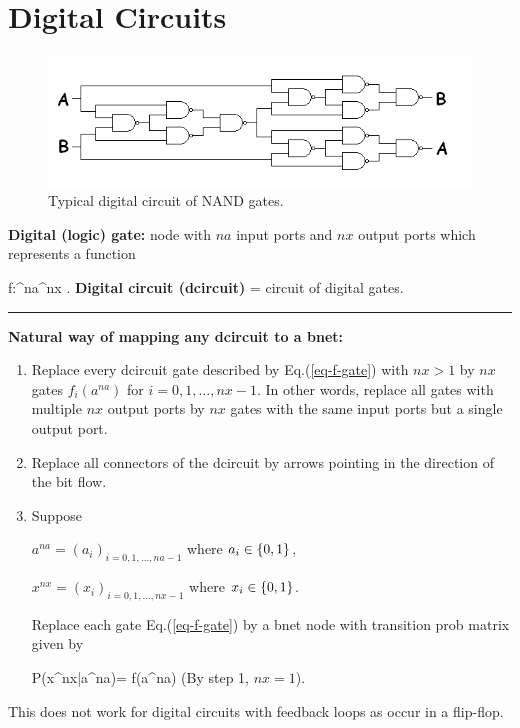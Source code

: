 \chapter{Digital Circuits}

\begin{figure}[h!]
\centering
\includegraphics[width=6in]{d-ckt/d-ckt.png}
\caption{Typical digital circuit
of NAND gates.}
\label{fig-d-ckt}
\end{figure}

{\bf Digital (logic) gate:} node with
$na$ input ports and $nx$ output ports
which represents a function

\beq
f:\bool^{na}\rarrow \bool^{nx}
\;.
\label{eq-f-gate}
\eeq
{\bf Digital circuit (dcircuit)} = circuit of digital gates.


\hrule\noindent
{\bf Natural way of mapping any
dcircuit to a bnet:}
\begin{enumerate}
\item
Replace every dcircuit  gate 
described by Eq.(\ref{eq-f-gate})
with
$nx>1$ by
$nx$ gates $f_i(a^{na})$
for $i=0, 1, \ldots, nx-1$.
In other words,
replace all gates
with
multiple $nx$ output ports
by $nx$ gates with the same input ports
but a single output port.
\item
Replace
all connectors of the dcircuit
by arrows 
pointing in the direction
of the bit flow.

\item
Suppose

$a^{na}=(a_i)_{i=0, 1,\dots, na-1}$ 
where $a_i\in \{0,1\}$,

$x^{nx}=(x_i)_{i=0, 1,\dots, nx-1}$ 
where $x_i\in \{0,1\}$. 

 Replace each gate Eq.(\ref{eq-f-gate})
 by a bnet 
node with transition
prob matrix given by


\beq\color{blue}
P(x^{nx}|a^{na})=
f(a^{na})
\eeq
(By step 1, $nx=1$).

\end{enumerate}

This does not work
for digital circuits 
with feedback loops 
as occur in a flip-flop.